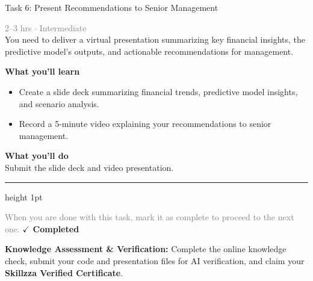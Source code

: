 \documentclass[10pt,a4paper]{article}
\begin{document}
\begin{taskbox}{Task 6: Present Recommendations to Senior Management}

    {\small \textcolor{gray}{2--3 hrs $\cdot$ Intermediate}}\\[12pt]

      
You need to deliver a virtual presentation summarizing key financial insights, the predictive model’s outputs, and actionable recommendations for management.  


\vspace{8pt}
{\large \textbf{\textcolor{brandLight}{What you'll learn}}}\\[4pt]  
\begin{itemize}
    \item Create a slide deck summarizing financial trends, predictive model insights, and scenario analysis.  
    \item Record a 5-minute video explaining your recommendations to senior management.  
\end{itemize}

\vspace{8pt}
{\large \textbf{\textcolor{brandLight}{What you'll do}}}\\[4pt]  
Submit the slide deck and video presentation.\par

    \vspace{16pt}

    \textcolor{cardBorder}{\hrule height 1pt}\vspace{8pt}

    \small \textcolor{gray}{When you are done with this task, mark it as complete to proceed to the next one.} \hfill \textbf{\textcolor{brandDark}{$\checkmark$ Completed}}

\end{taskbox}

\begin{completionbox}
    \textbf{Knowledge Assessment \& Verification:} Complete the online knowledge check, submit your code and presentation files for AI verification, and claim your \textbf{Skillzza Verified Certificate}.
\end{completionbox}

\newpage



\end{document}
